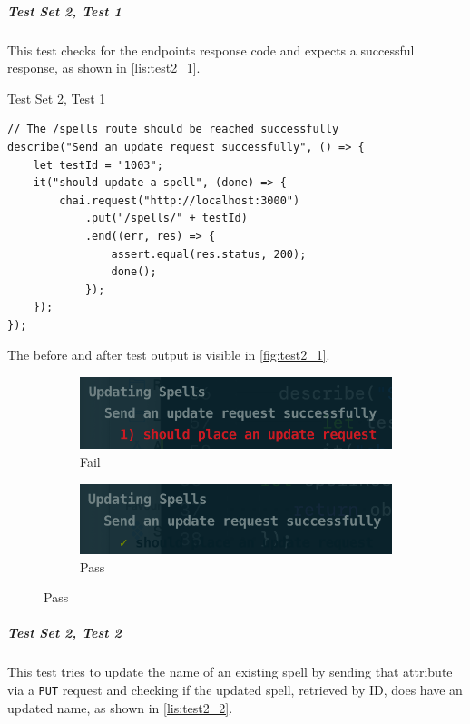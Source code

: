 \subparagraph{Test Set 2, Test 1} This test checks for the endpoints response code and expects a successful response, as shown in \autoref{lis:test2_1}.

\begin{listing}[h]
\caption{Test Set 2, Test 1}
\label{lis:test2_1}

\begin{verbatim}
// The /spells route should be reached successfully
describe("Send an update request successfully", () => {
	let testId = "1003";
	it("should update a spell", (done) => {
		chai.request("http://localhost:3000")
			.put("/spells/" + testId)
			.end((err, res) => {
				assert.equal(res.status, 200);
				done();
			});
	});
});
\end{verbatim}
\end{listing}

The before and after test output is visible in \autoref{fig:test2_1}.

\begin{figure}[h]
\caption{Test output for test set 2, test 1}
\label{fig:test2_1}
	\centering
	\begin{subfigure}[b]{0.5\textwidth}
		\centering
		\includegraphics[width=\textwidth]{images/21_fail}
		\caption{Fail}
		\label{fig:test21_fail}
	\end{subfigure}
	\hfill
	\begin{subfigure}[b]{0.5\textwidth}
		\centering
		\includegraphics[width=\textwidth]{images/21_pass}
		\caption{Pass}
		\label{fig:test21_pass}
	\end{subfigure}
\end{figure}

\subparagraph{Test Set 2, Test 2} This test tries to update the name of an existing spell by sending that attribute via a \texttt{PUT} request and checking if the updated spell, retrieved by ID, does have an updated name, as shown in \autoref{lis:test2_2}.

